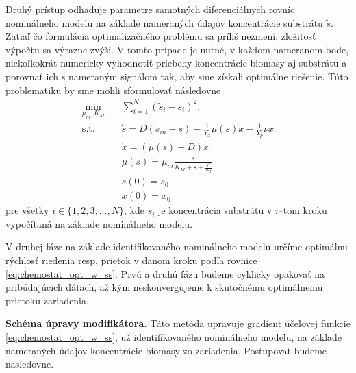Druhý prístup odhaduje parametre samotných diferenciálnych rovníc nominálneho modelu na základe nameraných údajov koncentrácie substrátu $ \tilde{s} $. Zatiaľ čo formulácia optimalizačného problému sa príliš nezmení, zložitosť výpočtu sa výrazne zvýši. V tomto prípade je nutné, v každom nameranom bode, niekoľkokrát numericky vyhodnotiť priebehy koncentrácie biomasy aj substrátu a porovnať ich s nameraným signálom  tak, aby sme získali optimálne riešenie. Túto problematiku by sme mohli sformulovať následovne
\begin{equation}
\label{eq:twostep_diff_pe}
	\begin{split}
		\min_{\mu_{m},K_{M}} \quad & \sum_{i=1}^{N} \left(\tilde{s}_{i}-s_{i}\right)^2, \\
		\textrm{s.t.} \quad & \dot{s} = D(s_{in}-s)-\frac{1}{Y_x}\mu(s)x-\frac{1}{Y_p}\nu x \\
		& \dot{x} = (\mu(s)-D)x \\
		& \mu(s)=\mu_{m}\frac{s}{K_{M} + s + \frac{s^2}{K_{I}}} \\
		& s(0) = s_0 \\
		& x(0) = x_0
	\end{split}
\end{equation}
pre všetky $ i \in \lbrace 1,2,3,\dots,N \rbrace $, kde $ s_{i} $ je koncentrácia substrátu v $ i $--tom kroku vypočítaná na základe nominálneho modelu.

V druhej fáze na základe identifikovaného nominálneho modelu určíme optimálnu rýchlosť riedenia resp. prietok v danom kroku podľa rovnice \eqref{eq:chemostat_opt_w_ss}. Prvú a druhú fázu budeme cyklicky opakovať na pribúdajúcich dátach, až kým neskonvergujeme k skutočnému optimálnemu prietoku zariadenia.

\textbf{Schéma úpravy modifikátora.}
Táto metóda upravuje gradient účelovej funkcie \eqref{eq:chemostat_opt_w_ss}, už identifikovaného nominálneho modelu, na základe nameraných údajov koncentrácie biomasy zo zariadenia. Postupovať budeme nasledovne.


